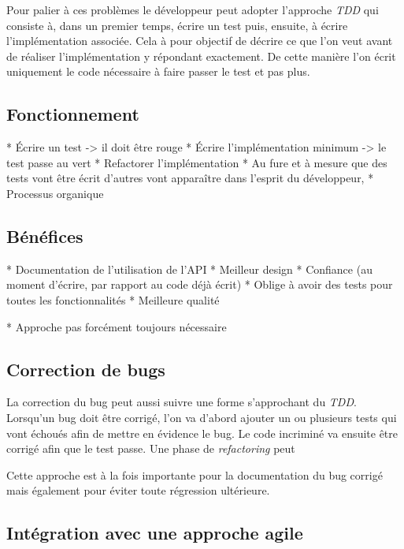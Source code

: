 \documentclass[journal, a4paper]{IEEEtran}
\begin{document}
Pour palier à ces problèmes le développeur peut adopter l'approche \emph{TDD} qui consiste à, dans un premier temps, écrire un test puis, ensuite, à écrire l'implémentation associée. Cela à pour objectif de décrire ce que l'on veut avant de réaliser l'implémentation y répondant exactement. De cette manière l'on écrit uniquement le code nécessaire à faire passer le test et pas plus.


\subsection{Fonctionnement}





* Écrire un test -> il doit être rouge
* Écrire l'implémentation minimum -> le test passe au vert
* Refactorer l'implémentation 
* Au fure et à mesure que des tests vont être écrit d'autres vont apparaître dans l'esprit du développeur, 
* Processus organique


\subsection{Bénéfices}


* Documentation de l'utilisation de l'API
* Meilleur design
* Confiance (au moment d'écrire, par rapport au code déjà écrit)
* Oblige à avoir des tests pour toutes les fonctionnalités
* Meilleure qualité

* Approche pas forcément toujours nécessaire



\subsection{Correction de bugs}

La correction du bug peut aussi suivre une forme s'approchant du \emph{TDD}. Lorsqu'un bug doit être corrigé, l'on va d'abord ajouter un ou plusieurs tests qui vont échoués afin de mettre en évidence le bug. Le code incriminé va ensuite être corrigé afin que le test passe. Une phase de \emph{refactoring} peut

Cette approche est à la fois importante pour la documentation du bug corrigé mais également pour éviter toute régression ultérieure.


\subsection{Intégration avec une approche agile}
\end{document}
